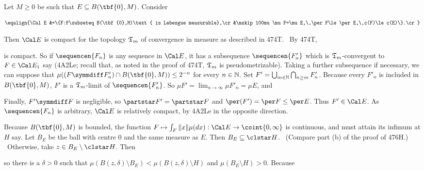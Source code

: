 { Let $M\ge 0$ be such that
$E\subseteq B(\tbf{0},M)$.   Consider

$$\eqalign{\Cal E
&=\{F:F\subseteq B(\tbf{0},M)\text{ is Lebesgue measurable},\cr
&\mskip100mu
\mu F=\mu E,\,\per F\le\per E,\,c(F)\le c(E)\}.\cr}$$

\noindent Then $\Cal E$ is compact for the topology $\frak T_m$ of
convergence in measure as described in 474T.   \Prf\ By 474T,


\noindent is compact.   So if $\sequencen{F_n}$ is any sequence in
$\Cal E$, it has a subsequence $\sequencen{F'_n}$ which is
$\frak T_m$-convergent to $F\in\Cal E_1$ say (4A2Le;  recall that, as noted
in the proof of 474T, $\frak T_m$ is pseudometrizable).
Taking a further subsequence
if necessary, we can suppose that
$\mu((F\symmdiff F'_n)\cap B(\tbf{0},M))\le 2^{-n}$ for every
$n\in\Bbb N$.   Set $F'=\bigcup_{m\in\Bbb N}\bigcap_{n\ge m}F'_n$.
Because every $F'_n$ is included in $B(\tbf{0},M)$,
$F'$ is a $\frak T_m$-limit of $\sequencen{F'_n}$.   So
$\mu F'=\lim_{n\to\infty}\mu F'_n=\mu E$, and


\noindent Finally, $F'\symmdiff F$ is negligible, so
$\partstar F'=\partstar F$ and $\per(F')=\per F\le\per E$.   Thus
$F'\in\Cal E$.   As $\sequencen{F_n}$ is arbitrary,
$\Cal E$ is relatively compact, by 4A2Le in the opposite direction.\ \Qed

\medskip

 Because $B(\tbf{0},M)$ is bounded,
the function $F\mapsto\int_F\|x\|\mu(dx):\Cal E\to\coint{0,\infty}$ is
continuous, and must attain its infimum at $H$ say.   Let $B_E$ be the ball
with centre $0$ and the same measure as $E$.   Then
$B_E\subseteq\clstar H$.   \Prf\ (Compare part (b) of the proof of
476H.)  \Quer\ Otherwise, take $z\in B_E\setminus\clstar H$.
Then


\noindent so there is a $\delta>0$ such that
$\mu(B(z,\delta)\setminus B_E)<\mu(B(z,\delta)\setminus H)$ and
$\mu(B_E\setminus H)>0$.   Because


}

